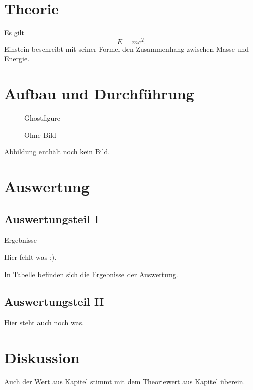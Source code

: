 \documentclass[captions=tableheading]{scrartcl}
\begin{document}
\section{Theorie}
  Es gilt
  \begin{equation}
      E = mc^2 .
  \end{equation}
  Einstein beschreibt mit seiner Formel den Zusammenhang zwischen Masse und Energie.

\section{Aufbau und Durchführung}
  \begin{figure}
    \centering
    Ghostfigure
    \caption{Ohne Bild}
  \end{figure}
  Abbildung enthält noch kein Bild.

\section{Auswertung}

\subsection{Auswertungsteil I}
  \begin{table}
    \centering
    \caption{Ergebnisse}
    Hier fehlt was ;).
  \end{table}
  In Tabelle befinden sich die Ergebnisse der Auswertung.

\subsection{Auswertungsteil II}
  Hier steht auch noch was.

\section{Diskussion}
  Auch der Wert aus Kapitel stimmt mit dem Theoriewert aus Kapitel überein.
\end{document}
